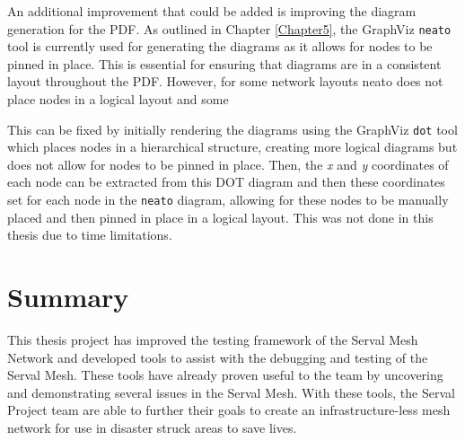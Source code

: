 An additional improvement that could be added is improving the diagram generation for the PDF.
As outlined in Chapter \ref{Chapter5}, the GraphViz \texttt{neato} tool is currently used for generating the diagrams as it allows for nodes to be pinned in place. 
This is essential for ensuring that diagrams are in a consistent layout throughout the PDF. 
However, for some network layouts neato does not place nodes in a logical layout and some 

This can be fixed by initially rendering the diagrams using the GraphViz \texttt{dot} tool which places nodes in a hierarchical structure, creating more logical diagrams but does not allow for nodes to be pinned in place.
Then, the \emph{x} and \emph{y} coordinates of each node can be extracted from this DOT diagram and then these coordinates set for each node in the \texttt{neato} diagram, allowing for these nodes to be manually placed and then pinned in place in a logical layout.
This was not done in this thesis due to time limitations.

\section{Summary}
This thesis project has improved the testing framework of the Serval Mesh Network and developed tools to assist with the debugging and testing of the Serval Mesh.
These tools have already proven useful to the team by uncovering and demonstrating several issues in the Serval Mesh.
With these tools, the Serval Project team are able to further their goals to create an infrastructure-less mesh network for use in disaster struck areas to save lives.
